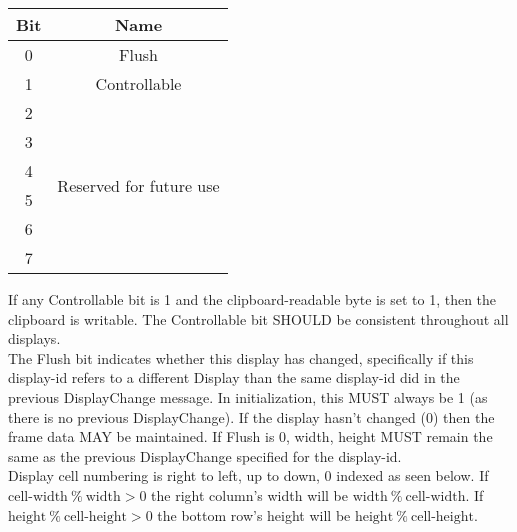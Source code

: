 \begin{center}
    \begin{tabular}{|c|c|}
        \hline
        \textbf{Bit} & \textbf{Name}                               \\
        \hline
        0            & Flush                                       \\
        \hline
        1            & Controllable                                \\
        \hline
        2            & \multirow{6}{10em}{Reserved for future use} \\
        3            &                                             \\
        4            &                                             \\
        5            &                                             \\
        6            &                                             \\
        7            &                                             \\
        \hline
    \end{tabular}
\end{center}

If any Controllable bit is 1 and the clipboard-readable byte is set to 1, then the clipboard is
writable. The Controllable bit SHOULD be consistent throughout all displays.\\

The Flush bit indicates whether this display has changed, specifically if this display-id refers to
a different Display than the same display-id did in the previous DisplayChange message. In
initialization, this MUST always be 1 (as there is no previous DisplayChange). If the display hasn't
changed (0) then the frame data MAY be maintained. If Flush is 0, width, height MUST remain
the same as the previous DisplayChange specified for the display-id.\\


Display cell numbering is right to left, up to down, 0 indexed as seen below. If $\text{cell-width}\ \%\
\text{width} > 0$ the right column's width will be $\text{width}\ \%\ \text{cell-width}$. If $\text{height}\
\%\ \text{cell-height} > 0$ the bottom row's height will be $\text{height}\ \%\ \text{cell-height}$.


